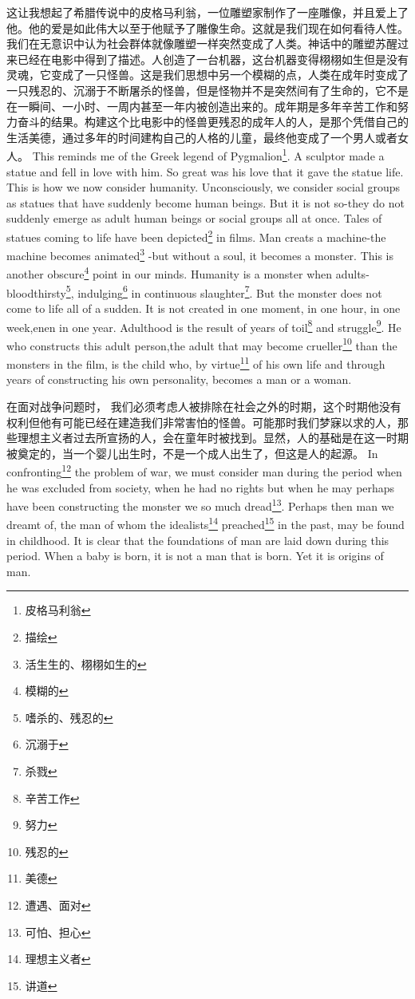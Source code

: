 \documentclass[lang=cn,10pt]{elegantbook}
\begin{document}
\begin{tcolorbox}[title=译文,
colback=red!5!white,
colframe=red!75!black,
fonttitle=\bfseries]
这让我想起了希腊传说中的皮格马利翁，一位雕塑家制作了一座雕像，并且爱上了他。他的爱是如此伟大以至于他赋予了雕像生命。这就是我们现在如何看待人性。我们在无意识中认为社会群体就像雕塑一样突然变成了人类。神话中的雕塑苏醒过来已经在电影中得到了描述。人创造了一台机器，这台机器变得栩栩如生但是没有灵魂，它变成了一只怪兽。这是我们思想中另一个模糊的点，人类在成年时变成了一只残忍的、沉溺于不断屠杀的怪兽，但是怪物并不是突然间有了生命的，它不是在一瞬间、一小时、一周内甚至一年内被创造出来的。成年期是多年辛苦工作和努力奋斗的结果。构建这个比电影中的怪兽更残忍的成年人的人，是那个凭借自己的生活美德，通过多年的时间建构自己的人格的儿童，最终他变成了一个男人或者女人。
This reminds me of the Greek legend of Pygmalion\footnote{皮格马利翁}. A sculptor made a statue and fell in love with him. So great was his love that it gave the statue life. This is how we now consider humanity. Unconsciously, we consider social groups as statues that have suddenly become human beings. But it is not so-they do not suddenly emerge as adult human beings or social groups all at once. Tales of statues coming to life have been depicted\footnote{描绘} in films. Man creats a machine-the machine becomes animated\footnote{活生生的、栩栩如生的} -but without a soul, it becomes a monster. This is another obscure\footnote{模糊的} point in our minds. Humanity is a monster when adults-bloodthirsty\footnote{嗜杀的、残忍的}, indulging\footnote{沉溺于} in continuous slaughter\footnote{杀戮}. But the monster does not come to life all of a sudden. It is not created in one moment, in one hour, in one week,enen in one year. Adulthood is the result of years of toil\footnote{辛苦工作} and struggle\footnote{努力}. He who constructs this adult person,the adult that may become crueller\footnote{残忍的} than the monsters in the film, is the child who, by virtue\footnote{美德} of his own life and through years of constructing his own personality, becomes a man or a woman.
\end{tcolorbox}

\begin{tcolorbox}[title=译文,
colback=red!5!white,
colframe=red!75!black,
fonttitle=\bfseries]
在面对战争问题时， 我们必须考虑人被排除在社会之外的时期，这个时期他没有权利但他有可能已经在建造我们非常害怕的怪兽。可能那时我们梦寐以求的人，那些理想主义者过去所宣扬的人，会在童年时被找到。显然，人的基础是在这一时期被奠定的，当一个婴儿出生时，不是一个成人出生了，但这是人的起源。
In confronting\footnote{遭遇、面对} the problem of war, we must consider man during the period when he was excluded from society, when he had no rights but when he may perhaps have been constructing the monster we so much dread\footnote{可怕、担心}. Perhaps then man we dreamt of, the man of whom the idealists\footnote{理想主义者} preached\footnote{讲道} in the past, may be found in childhood. It is clear that the foundations of man are laid down during this period. When a baby is born, it is not a man that is born. Yet it is origins of man.
\end{tcolorbox}
\end{document}
